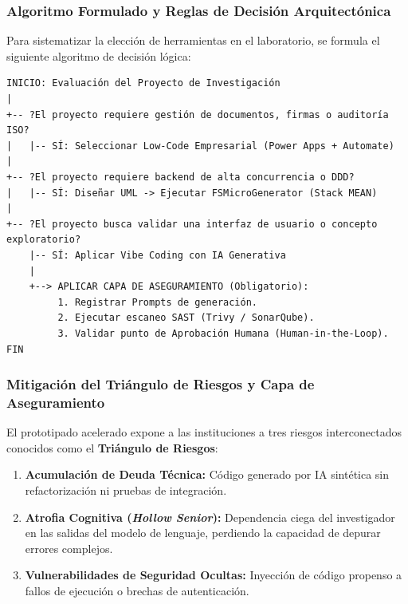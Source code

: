 \subsubsection{Algoritmo Formulado y Reglas de Decisión Arquitectónica}

Para sistematizar la elección de herramientas en el laboratorio, se formula el siguiente algoritmo de decisión lógica:

\begin{tcolorbox}[colback=bg_marfil, colframe=unmsm_gold, arc=3pt, boxrule=0.6pt, top=0.25cm, bottom=0.25cm, left=0.4cm, right=0.4cm]
\footnotesize
\begin{verbatim}
INICIO: Evaluación del Proyecto de Investigación
|
+-- ?El proyecto requiere gestión de documentos, firmas o auditoría ISO?
|   |-- SÍ: Seleccionar Low-Code Empresarial (Power Apps + Automate)
|
+-- ?El proyecto requiere backend de alta concurrencia o DDD?
|   |-- SÍ: Diseñar UML -> Ejecutar FSMicroGenerator (Stack MEAN)
|
+-- ?El proyecto busca validar una interfaz de usuario o concepto exploratorio?
    |-- SÍ: Aplicar Vibe Coding con IA Generativa
    |
    +--> APLICAR CAPA DE ASEGURAMIENTO (Obligatorio):
         1. Registrar Prompts de generación.
         2. Ejecutar escaneo SAST (Trivy / SonarQube).
         3. Validar punto de Aprobación Humana (Human-in-the-Loop).
FIN
\end{verbatim}
\end{tcolorbox}

\subsubsection{Mitigación del Triángulo de Riesgos y Capa de Aseguramiento}

El prototipado acelerado expone a las instituciones a tres riesgos interconectados conocidos como el \textbf{Triángulo de Riesgos}:

\begin{enumerate}
    \item \textbf{Acumulación de Deuda Técnica:} Código generado por IA sintética sin refactorización ni pruebas de integración.
    \item \textbf{Atrofia Cognitiva (\textit{Hollow Senior}):} Dependencia ciega del investigador en las salidas del modelo de lenguaje, perdiendo la capacidad de depurar errores complejos.
    \item \textbf{Vulnerabilidades de Seguridad Ocultas:} Inyección de código propenso a fallos de ejecución o brechas de autenticación.
\end{enumerate}


